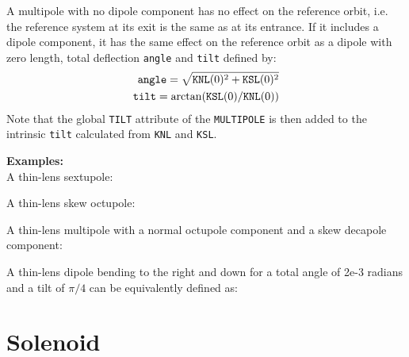 A multipole with no dipole component has no effect on the reference
orbit, i.e. the reference system at its exit is the same as at its
entrance. If it includes a dipole component, it has the same effect on
the reference orbit as a dipole with zero length, total deflection 
{\tt angle} and {\tt tilt} defined by:
\begin{eqnarray}
{\tt angle}  =  \sqrt{ {\tt KNL}(0)^2 + {\tt KSL}(0)^2 }\\
{\tt tilt}  = \arctan ({\tt KSL}(0) / {\tt KNL}(0))  
\end{eqnarray}
Note that the global {\tt TILT} attribute of the {\tt MULTIPOLE} is then
added to the intrinsic {\tt tilt} calculated from {\tt KNL} and {\tt KSL}.



{\bf Examples:}\\
A thin-lens sextupole:  

A thin-lens skew octupole:  

A thin-lens multipole with a normal octupole component and a skew decapole
component:

A thin-lens dipole bending to the right and down for a total angle of
2e-3 radians and a tilt of $\pi/4$ can be equivalently defined as:






\section{Solenoid}
\label{sec:solenoid}

